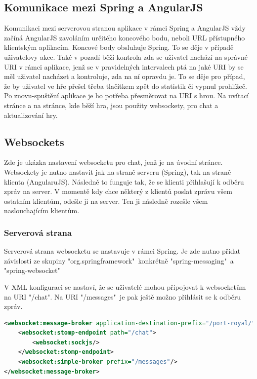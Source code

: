 \documentclass[czech,master,public,dept460,male,cpdeclaration,twoside]{diploma}
\begin{document}
\subsection{Komunikace mezi Spring a AngularJS}
Komunikaci mezi serverovou stranou aplikace v rámci Spring a AngularJS vždy začíná AngularJS zavoláním určitého koncového bodu, neboli URL přístupného klientským aplikacím. Koncové body obsluhuje Spring. To se děje v případě uživatelovy akce. Také v pozadí běží kontrola zda se uživatel nachází na správné URI v rámci aplikace, jenž se v pravidelných intervalech ptá na jaké URI by se měl uživatel nacházet a kontroluje, zda na ní opravdu je. To se děje pro případ, že by uživatel ve hře přešel třeba tlačítkem zpět do statistik či vypnul prohlížeč. Po znovu-spuštění aplikace je ho potřeba přesměrovat na URI s hrou. Na uvítací stránce a na stránce, kde běží hra, jsou použity websockety, pro chat a aktualizování hry.

\subsection{Websockets}
Zde je ukázka nastavení websocketu pro chat, jenž je na úvodní stránce. Websockety je nutno nastavit jak na straně serveru (Spring), tak na straně klienta (AngularuJS). Následně to funguje tak, že se klienti přihlašují k odběru zpráv na server. V momentě kdy chce některý z klientů poslat zprávu všem ostatním klientům, odešle ji na server. Ten ji následně rozešle všem naslouchajícím klientům.

\subsubsection{Serverová strana}
Serverová strana websocketu se nastavuje v rámci Spring. Je zde nutno přidat závislosti ze skupiny "org.springframework"~konkrétně "spring-messaging"~a "spring-websocket"

V XML konfiguraci se nastaví, že se uživatelé mohou připojovat k websocketům na URI "/chat". Na URI "/messages"~je pak ještě možno přihlásit se k odběru zpráv.\\
\begin{lstlisting}[language=XML, caption=XML konfigurace websocketu]
<websocket:message-broker application-destination-prefix="/port-royal/">
    <websocket:stomp-endpoint path="/chat">
        <websocket:sockjs/>
    </websocket:stomp-endpoint>
    <websocket:simple-broker prefix="/messages"/>
</websocket:message-broker>
\end{lstlisting}
\end{document}
